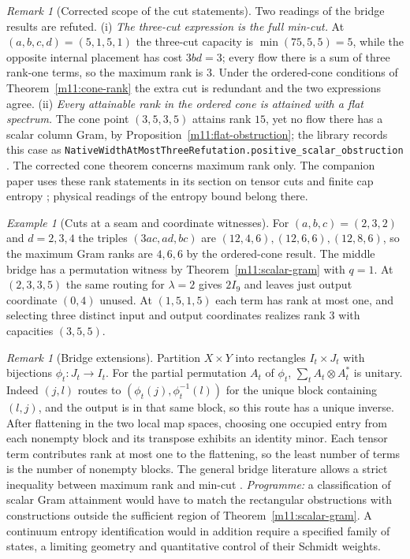 \documentclass[11pt,reqno]{amsart}
\theoremstyle{definition}
\theoremstyle{remark}
\newtheorem{remark}[theorem]{Remark}
\newtheorem{example}[theorem]{Example}
\numberwithin{equation}{section}
\begin{document}
\begin{remark}[Corrected scope of the cut statements]\label{m11:cut-scope}\sloppy
Two readings of the bridge results are refuted.
(i) \emph{The three-cut expression is the full min-cut.} At
$(a,b,c,d)=(5,1,5,1)$ the three-cut capacity is $\min(75,5,5)=5$, while the
opposite internal placement has cost $3bd=3$; every flow there is a sum of
three rank-one terms, so the maximum rank is $3$. Under the ordered-cone
conditions of Theorem~\ref{m11:cone-rank} the extra cut is redundant and the
two expressions agree.
(ii) \emph{Every attainable rank in the ordered cone is attained with a flat
spectrum.} The cone point $(3,5,3,5)$ attains rank $15$, yet no flow there has
a scalar column Gram, by Proposition~\ref{m11:flat-obstruction}; the library
records this case as \texttt{NativeWidthAtMostThreeRefutation}\allowbreak\texttt{.positive\_scalar\_obstruction}
\cite{Tru}. The corrected cone theorem concerns maximum rank only.
The companion paper uses these rank statements in its section on tensor cuts
and finite cap entropy \cite{Companion}; physical readings of the entropy
bound belong there.
\end{remark}

\begin{example}[Cuts at a seam and coordinate witnesses]\label{m11:bridge-examples}
For $(a,b,c)=(2,3,2)$ and $d=2,3,4$ the triples
$(3ac,ad,bc)$ are $(12,4,6),(12,6,6),(12,8,6)$,
so the maximum Gram ranks are $4,6,6$ by the ordered-cone
result. The middle bridge has a permutation witness by
Theorem~\ref{m11:scalar-gram} with $q=1$. At $(2,3,3,5)$
the same routing for $\lambda=2$ gives $2I_9$ and leaves just
output coordinate $(0,4)$ unused. At $(1,5,1,5)$ each term has
rank at most one, and selecting three distinct input and output
coordinates realizes rank $3$ with capacities $(3,5,5)$.
\end{example}

\begin{remark}[Bridge extensions]\label{m11:bridge-programme}
Partition $X\times Y$ into rectangles $I_t\times J_t$ with
bijections $\phi_t:J_t\to I_t$. For the partial permutation $A_t$
of $\phi_t$, $\sum_t A_t\otimes A_t^*$ is unitary.
Indeed $(j,l)$ routes to $(\phi_t(j),\phi_t^{-1}(l))$ for the
unique block containing $(l,j)$, and the output is in that same block,
so this route has a unique inverse. After flattening in the two local
map spaces, choosing one occupied entry from each nonempty block and
its transpose exhibits an identity minor. Each tensor term contributes
rank at most one to the flattening, so the least number of terms is
the number of nonempty blocks. The general bridge literature allows a
strict inequality between maximum rank and min-cut
\cite{m11:Cui,m11:GLS}. \emph{Programme:} a classification of scalar Gram
attainment would have to match the rectangular obstructions with
constructions outside the sufficient region of
Theorem~\ref{m11:scalar-gram}. A continuum entropy identification would in
addition require a specified family of states, a limiting geometry and
quantitative control of their Schmidt weights.
\end{remark}
\end{document}
